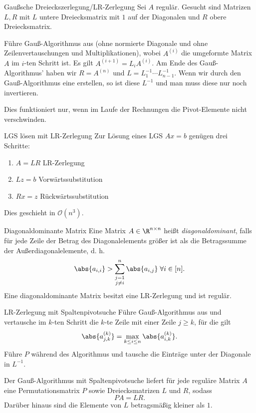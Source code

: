 \begin{karte}{Gaußsche Dreieckszerlegung/LR-Zerlegung}
    Sei \(A\) regulär. Gesucht sind Matrizen \( L, R \) mit 
    \(L\) untere Dreiecksmatrix mit \(1\) auf der Diagonalen und 
    \(R\) obere Dreiecksmatrix. 

    Führe Gauß-Algorithmus aus (ohne normierte Diagonale und ohne Zeilenvertauschungen und Multiplikationen), 
    wobei \(A^{(i)}\) die umgeformte Matrix \(A\) im \(i\)-ten Schritt ist.
    Es gilt \( A^{(i+1)} = L_i A^{(i)} \). 
    Am Ende des Gauß-Algorithmus' haben wir \( R = A^{(n)} \) 
    und \( L = L_1^{-1}\cdots L_{n-1}^{-1} \).
    Wenn wir durch den Gauß-Algorithmus eine  erstellen, 
    so ist diese \( L^{-1} \) und man muss diese nur noch invertieren.

    Dies funktioniert nur, wenn im Laufe der Rechnungen die Pivot-Elemente nicht verschwinden.
\end{karte}

\begin{karte}{LGS lösen mit LR-Zerlegung}
    Zur Lösung eines LGS \( Ax = b \) genügen drei Schritte: 
    \begin{enumerate}
        \item \( A = LR \) LR-Zerlegung
        \item \( Lz = b \) Vorwärtssubstitution
        \item \( Rx = z \) Rückwärtssubstitution
    \end{enumerate}
    Dies geschieht in \( \mathcal{O}(n^3) \).
\end{karte}

\begin{karte}{Diagonaldominante Matrix}
    Eine Matrix \( A \in \R^{n\times n} \) heißt \textit{diagonaldominant}, falls für jede Zeile der 
    Betrag des Diagonalelements größer ist als die Betragssumme der Außerdiagonalelemente, d. h. 
    \[ \abs{a_{i,i}} > \sum_{\substack{j=1\\j\neq i}}^n \abs{a_{i,j}} \;\forall i \in [n]. \]
    Eine diagonaldominante Matrix besitzt eine LR-Zerlegung und ist regulär.
\end{karte}

\begin{karte}{LR-Zerlegung mit Spaltenpivotsuche}
    Führe Gauß-Algorithmus aus und vertausche im \(k\)-ten Schritt die \( k \)-te Zeile 
    mit einer Zeile \( j \geq k \), für die gilt 
    \[ \abs{ a_{j,k}^{(k)} } = \max_{k\leq i \leq n} \abs{a_{i,k}^{(k)}}. \]
    Führe  \( P \) während des Algorithmus und tausche die Einträge 
    unter der Diagonale in \( L^{-1} \).

    Der Gauß-Algorithmus mit Spaltenpivotsuche liefert für jede reguläre Matrix \( A \)
    eine Permutationsmatrix \(P\) sowie Dreiecksmatrizen \(L\) und \(R\), sodass 
    \[ PA = LR. \]
    Darüber hinaus sind die Elemente von \(L\) betragsmäßig kleiner als \(1\).
\end{karte}

